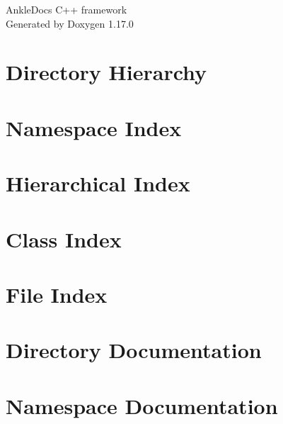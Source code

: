 \documentclass[twoside]{book}
\newcommand{\+}{\discretionary{\mbox{\scriptsize$\hookleftarrow$}}{}{}}
\newcommand{\clearemptydoublepage}{%
    \newpage{\pagestyle{empty}\cleardoublepage}%
  }
\begin{document}
  \raggedbottom
    \hypersetup{pageanchor=false,
                bookmarksnumbered=true,
                pdfencoding=unicode
               }
  \begin{titlepage}
  \vspace*{7cm}
  \begin{center}%
  {\Large Ankle\+Docs C++ framework}\\
  \vspace*{1cm}
  {\large Generated by Doxygen 1.17.0}\\
  \end{center}
  \end{titlepage}
  \clearemptydoublepage
  \tableofcontents
  \clearemptydoublepage
  \hypersetup{pageanchor=true}
\chapter{Directory Hierarchy}

\chapter{Namespace Index}

\chapter{Hierarchical Index}

\chapter{Class Index}

\chapter{File Index}

\chapter{Directory Documentation}

\chapter{Namespace Documentation}



\end{document}
